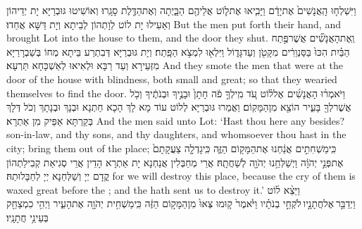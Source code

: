 {וַיִּשְׁלְח֤וּ הָֽאֲנָשִׁים֙ אֶת\maqqaf יָדָ֔ם וַיָּבִ֧יאוּ אֶת\maqqaf ל֛וֹט אֲלֵיהֶ֖ם הַבָּ֑יְתָה וְאֶת\maqqaf הַדֶּ֖לֶת סָגָֽרוּ׃}
{וְאוֹשִׁיטוּ גּוּבְרַיָּא יָת יְדֵיהוֹן וְאַעִילוּ יָת לוֹט לְוָתְהוֹן לְבֵיתָא וְיָת דַּשָּׁא אֲחַדוּ׃}
{But the men put forth their hand, and brought Lot into the house to them, and the door they shut.}{}
{וְֽאֶת\maqqaf הָאֲנָשִׁ֞ים אֲשֶׁר\maqqaf פֶּ֣תַח הַבַּ֗יִת הִכּוּ֙ בַּסַּנְוֵרִ֔ים מִקָּטֹ֖ן וְעַד\maqqaf גָּד֑וֹל וַיִּלְא֖וּ לִמְצֹ֥א הַפָּֽתַח׃}
{וְיָת גּוּבְרַיָּא דְּבִתְרַע בֵּיתָא מְחוֹ בְּשַׁבְרָרַיָּא מִזְּעֵירָא וְעַד רַבָּא וּלְאִיאוּ לְאַשְׁכָּחָא תַּרְעָא׃}
{And they smote the men that were at the door of the house with blindness, both small and great; so that they wearied themselves to find the door.}{}
{וַיֹּאמְר֨וּ הָאֲנָשִׁ֜ים אֶל\maqqaf ל֗וֹט עֹ֚ד מִֽי\maqqaf לְךָ֣ פֹ֔ה חָתָן֙ וּבָנֶ֣יךָ וּבְנֹתֶ֔יךָ וְכֹ֥ל אֲשֶׁר\maqqaf לְךָ֖ בָּעִ֑יר הוֹצֵ֖א מִן\maqqaf הַמָּקֽוֹם׃}
{וַאֲמַרוּ גּוּבְרַיָּא לְלוֹט עוֹד מָא לָךְ הָכָא חַתְנָא וּבְנָךְ וּבְנָתָךְ וְכֹל דְּלָךְ בְּקַרְתָּא אַפֵּיק מִן אַתְרָא׃}
{And the men said unto Lot: ‘Hast thou here any besides? son-in-law, and thy sons, and thy daughters, and whomsoever thou hast in the city; bring them out of the place;}{}
{כִּֽי\maqqaf מַשְׁחִתִ֣ים אֲנַ֔חְנוּ אֶת\maqqaf הַמָּק֖וֹם הַזֶּ֑ה כִּֽי\maqqaf גָדְלָ֤ה צַעֲקָתָם֙ אֶת\maqqaf פְּנֵ֣י יְהֹוָ֔ה וַיְשַׁלְּחֵ֥נוּ יְהֹוָ֖ה לְשַׁחֲתָֽהּ׃}
{אֲרֵי מְחַבְּלִין אֲנַחְנָא יָת אַתְרָא הָדֵין אֲרֵי סְגִיאַת קְבִילַתְהוֹן קֳדָם יְיָ וְשַׁלְּחַנָא יְיָ לְחַבָּלוּתַהּ׃}
{for we will destroy this place, because the cry of them is waxed great before the \lord; and the \lord\space hath sent us to destroy it.’}{}
{וַיֵּצֵ֨א ל֜וֹט וַיְדַבֵּ֣ר \legarmeh  אֶל\maqqaf חֲתָנָ֣יו \legarmeh  לֹקְחֵ֣י בְנֹתָ֗יו וַיֹּ֙אמֶר֙ ק֤וּמוּ צְּאוּ֙ מִן\maqqaf הַמָּק֣וֹם הַזֶּ֔ה כִּֽי\maqqaf מַשְׁחִ֥ית יְהֹוָ֖ה אֶת\maqqaf הָעִ֑יר וַיְהִ֥י כִמְצַחֵ֖ק בְּעֵינֵ֥י חֲתָנָֽיו׃}
